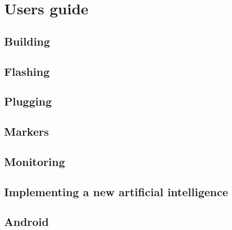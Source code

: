 \documentclass[a4paper,11pt]{report}
\begin{document}
\chapter{Users guide}

\section{Building}

\section{Flashing}

\section{Plugging}

\section{Markers}

\section{Monitoring}

\section{Implementing a new artificial intelligence}

\section{Android}
\end{document}
